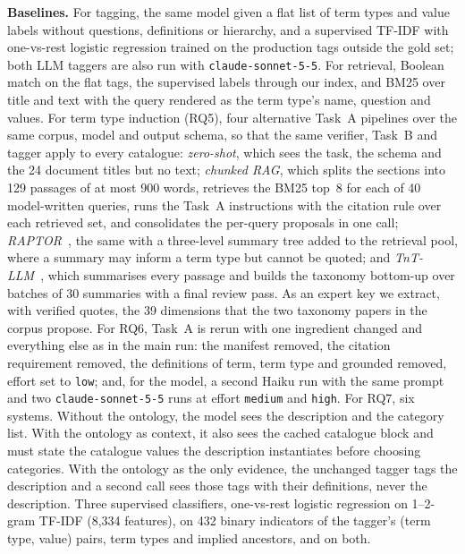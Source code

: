 \textbf{Baselines.} For tagging, the same model given a flat list of term
types and value labels without questions, definitions or hierarchy, and a
supervised TF-IDF with one-vs-rest logistic regression trained on the
production tags outside the gold set; both LLM taggers are also run with
\texttt{claude-sonnet-5-5}. For retrieval, Boolean match on the
flat tags, the supervised labels through our index, and BM25 over title and
text with the query rendered as the term type's name, question and values.
For term type induction (RQ5), four alternative Task~A pipelines over the
same corpus, model and output schema, so that the same verifier, Task~B and
tagger apply to every catalogue: \emph{zero-shot}, which sees the task, the
schema and the 24 document titles but no text; \emph{chunked RAG}, which
splits the sections into 129 passages of at most 900 words, retrieves the
BM25 top~8 for each of 40 model-written queries, runs the Task~A instructions
with the citation rule over each retrieved set, and consolidates the
per-query proposals in one call; \emph{RAPTOR}~\cite{sarthi2024raptor}, the
same with a three-level summary tree added to the retrieval pool, where a
summary may inform a term type but cannot be quoted; and
\emph{TnT-LLM}~\cite{wan2024tntllm}, which summarises every passage and
builds the taxonomy bottom-up over batches of 30 summaries with a final
review pass. As an expert key we extract, with verified quotes, the 39
dimensions that the two taxonomy papers in the corpus propose. For RQ6,
Task~A is rerun with one ingredient changed and everything else as in the
main run: the manifest removed, the citation requirement removed, the
definitions of term, term type and grounded removed, effort set to
\texttt{low}; and, for the model, a second Haiku run with the same prompt and
two \texttt{claude-sonnet-5-5} runs at effort \texttt{medium} and \texttt{high}.
For RQ7, six systems. Without the ontology, the model sees the description
and the category list. With the ontology as context, it also sees the
cached catalogue block and must state the catalogue values the description
instantiates before choosing categories. With the ontology as the only
evidence, the unchanged tagger tags the description and a second call sees
those tags with their definitions, never the description. Three supervised
classifiers, one-vs-rest logistic regression on 1--2-gram TF-IDF (8,334
features), on 432 binary indicators of the tagger's (term type, value)
pairs, term types and implied ancestors, and on both.

